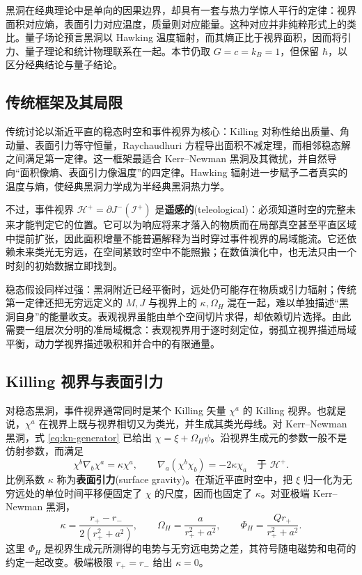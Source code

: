 黑洞在经典理论中是单向的因果边界，却具有一套与热力学惊人平行的定律：视界面积对应熵，表面引力对应温度，质量则对应能量。这种对应并非纯粹形式上的类比。量子场论预言黑洞以 Hawking 温度辐射，而其熵正比于视界面积，因而将引力、量子理论和统计物理联系在一起。本节仍取 $G=c=k_B=1$，但保留 $\hbar$，以区分经典结论与量子结论。

\subsection{传统框架及其局限}

传统讨论以渐近平直的稳态时空和事件视界为核心：Killing 对称性给出质量、角动量、表面引力等守恒量，Raychaudhuri 方程导出面积不减定理，而相邻稳态解之间满足第一定律。这一框架最适合 Kerr--Newman 黑洞及其微扰，并自然导向“面积像熵、表面引力像温度”的四定律。Hawking 辐射进一步赋予二者真实的温度与熵，使经典黑洞力学成为半经典黑洞热力学。

不过，事件视界 $\mathcal H^+=\partial J^-(\mathscr I^+)$ 是\textbf{遥感的}(teleological)：必须知道时空的完整未来才能判定它的位置。它可以为响应将来才落入的物质而在局部真空甚至平直区域中提前扩张，因此面积增量不能普遍解释为当时穿过事件视界的局域能流。它还依赖未来类光无穷远，在空间紧致时空中不能照搬；在数值演化中，也无法只由一个时刻的初始数据立即找到。

稳态假设同样过强：黑洞附近已经平衡时，远处仍可能存在物质或引力辐射；传统第一定律还把无穷远定义的 $M,J$ 与视界上的 $\kappa,\Omega_H$ 混在一起，难以单独描述“黑洞自身”的能量收支。表观视界虽能由单个空间切片求得，却依赖切片选择。由此需要一组层次分明的准局域概念：表观视界用于逐时刻定位，弱孤立视界描述局域平衡，动力学视界描述吸积和并合中的有限通量。

\subsection{Killing 视界与表面引力}

对稳态黑洞，事件视界通常同时是某个 Killing 矢量 $\chi^a$ 的 Killing 视界。也就是说，$\chi^a$ 在视界上既与视界相切又为类光，并生成其类光母线。对 Kerr--Newman 黑洞，式 \eqref{eq:kn-generator} 已给出 $\chi=\xi+\Omega_H\psi$。沿视界生成元的参数一般不是仿射参数，而满足
\begin{equation}\label{eq:surface-gravity-def}
    \chi^b\nabla_b\chi^a=\kappa\chi^a,
    \qquad
    \nabla_a(\chi^b\chi_b)=-2\kappa\chi_a
    \quad\text{于 }\mathcal H^+ .
\end{equation}
比例系数 $\kappa$ 称为\textbf{表面引力}(surface gravity)。在渐近平直时空中，把 $\xi$ 归一化为无穷远处的单位时间平移便固定了 $\chi$ 的尺度，因而也固定了 $\kappa$。对亚极端 Kerr--Newman 黑洞，
\begin{equation}\label{eq:kn-thermo-potentials}
    \kappa=\frac{r_+-r_-}{2(r_+^2+a^2)},\qquad
    \Omega_H=\frac{a}{r_+^2+a^2},\qquad
    \Phi_H=\frac{Qr_+}{r_+^2+a^2}.
\end{equation}
这里 $\Phi_H$ 是视界生成元所测得的电势与无穷远电势之差，其符号随电磁势和电荷的约定一起改变。极端极限 $r_+=r_-$ 给出 $\kappa=0$。

